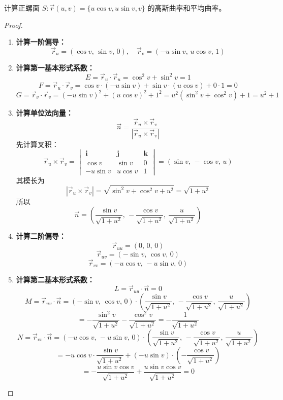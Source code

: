\documentclass[lang=cn,10pt,thmcnt=section]{elegantbook}
\begin{document}
\begin{example}
	计算正螺面 $S: \vec{r}(u,v) = \{u\cos v, u\sin v, v\}$ 的高斯曲率和平均曲率。
\end{example}
\begin{proof}
    \begin{enumerate}
        \item \textbf{计算一阶偏导：}
        \[
        \vec{r}_u = (\cos v,\, \sin v,\, 0), \quad \vec{r}_v = (-u\sin v,\, u\cos v,\, 1)
        \]

        \item \textbf{计算第一基本形式系数：}
        \[
        E = \vec{r}_u \cdot \vec{r}_u = \cos^2 v + \sin^2 v = 1
        \]
        \[
        F = \vec{r}_u \cdot \vec{r}_v = \cos v \cdot (-u\sin v) + \sin v \cdot (u\cos v) + 0 \cdot 1 = 0
        \]
        \[
        G = \vec{r}_v \cdot \vec{r}_v = (-u\sin v)^2 + (u\cos v)^2 + 1^2 = u^2(\sin^2 v + \cos^2 v) + 1 = u^2 + 1
        \]

        \item \textbf{计算单位法向量：}
        \[
        \vec{n} = \frac{\vec{r}_u \times \vec{r}_v}{|\vec{r}_u \times \vec{r}_v|}
        \]
        先计算叉积：
        \[
        \vec{r}_u \times \vec{r}_v =
        \begin{vmatrix}
        \mathbf{i} & \mathbf{j} & \mathbf{k} \\
        \cos v & \sin v & 0 \\
        -u\sin v & u\cos v & 1
        \end{vmatrix}
        = \left( \sin v,\, -\cos v,\, u \right)
        \]
        其模长为
        \[
        |\vec{r}_u \times \vec{r}_v| = \sqrt{\sin^2 v + \cos^2 v + u^2} = \sqrt{1 + u^2}
        \]
        所以
        \[
        \vec{n} = \left( \frac{\sin v}{\sqrt{1+u^2}},\, -\frac{\cos v}{\sqrt{1+u^2}},\, \frac{u}{\sqrt{1+u^2}} \right)
        \]

        \item \textbf{计算二阶偏导：}
        \[
        \vec{r}_{uu} = (0,\, 0,\, 0)
        \]
        \[
        \vec{r}_{uv} = (-\sin v,\, \cos v,\, 0)
        \]
        \[
        \vec{r}_{vv} = (-u\cos v,\, -u\sin v,\, 0)
        \]

        \item \textbf{计算第二基本形式系数：}
        \[
        L = \vec{r}_{uu} \cdot \vec{n} = 0
        \]
        \[
        M = \vec{r}_{uv} \cdot \vec{n} = (-\sin v,\, \cos v,\, 0) \cdot \left( \frac{\sin v}{\sqrt{1+u^2}},\, -\frac{\cos v}{\sqrt{1+u^2}},\, \frac{u}{\sqrt{1+u^2}} \right)
        \]
        \[
        = -\frac{\sin^2 v}{\sqrt{1+u^2}} - \frac{\cos^2 v}{\sqrt{1+u^2}} = -\frac{1}{\sqrt{1+u^2}}
        \]
        \[
        N = \vec{r}_{vv} \cdot \vec{n} = (-u\cos v,\, -u\sin v,\, 0) \cdot \left( \frac{\sin v}{\sqrt{1+u^2}},\, -\frac{\cos v}{\sqrt{1+u^2}},\, \frac{u}{\sqrt{1+u^2}} \right)
        \]
        \[
        = -u\cos v \cdot \frac{\sin v}{\sqrt{1+u^2}} + (-u\sin v) \cdot \left(-\frac{\cos v}{\sqrt{1+u^2}}\right)
        \]
        \[
        = -\frac{u\sin v\cos v}{\sqrt{1+u^2}} + \frac{u\sin v\cos v}{\sqrt{1+u^2}} = 0
        \]


\end{enumerate}
\end{proof}
\end{document}

